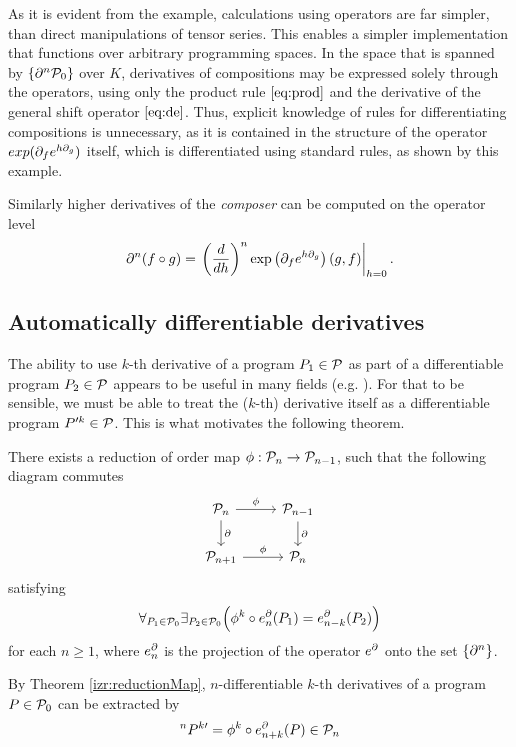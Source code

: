  As it is evident from the example, calculations using operators are far
 simpler, than direct manipulations of tensor series. This enables a simpler
 implementation that functions over arbitrary programming spaces. In
 the space that is spanned by $\{\partial^n\mathcal{P}_0\}$ over $K$, derivatives of
 compositions may be expressed solely through the operators, using only the
 product rule $\eqref{eq:prod}$ and the derivative of the general shift operator
 $\eqref{eq:de}$. Thus, explicit knowledge of rules for differentiating
 compositions is unnecessary, as it is contained in the structure of the
 operator $exp(\partial_fe^{h\partial_g})$ itself, which is differentiated using standard
 rules, as shown by this example. 

 Similarly higher derivatives of the \emph{composer} can be computed on the
 operator level
 \begin{equation}\label{eq:dkompo}
 \partial^n(f\circ g)=\left.\left(\frac{d}{dh}\right)^n\exp\left(\partial_fe^{h\partial_g}\right)(g,f)\right|_{h=0}.
 \end{equation}

 \subsection{Automatically differentiable derivatives}\label{sec:orderReduction}
 
 The ability to use $k$-th derivative of a program $P_1\in\mathcal{P}$ as part of a differentiable program $P_2\in\mathcal{P}$ appears to be useful in many fields (e.g. \cite{StatMC}). For that to be sensible, we must be able to treat the ($k$-th) derivative itself as a differentiable program $P^{\prime k}\in\mathcal{P}$. This is what motivates the following theorem. 

\begin{theorem}\label{izr:reductionMap}
There exists a reduction of order map $\phi:\mathcal{P}_n\to \mathcal{P}_{n-1}$, such that the
following  diagram commutes
\begin{equation}\label{eq:reductionMap}
\begin{tikzcd}
  \dP_n \arrow{r}{\phi} \arrow{d}{\D} & 
  \dP_{n-1} \arrow{d}{\D}\\
  \dP_{n+1} \arrow{r}{\phi} & 
  \dP_{n}
\end{tikzcd}
\end{equation}
satisfying
\begin{equation*}
\forall_{P_1\in\mathcal{P}_0}\exists_{P_2\in\mathcal{P}_0}\Big(\phi^k\circ e^\partial_n(P_1)=e^\partial_{n-k}(P_2)\Big)
\end{equation*}
for each $n\ge 1$, where $e^\partial_n$ is the projection of the operator $e^\partial$ onto the set $\{\partial^n\}$.
\end{theorem}  
\begin{corollary}\label{cor:extraxtDerivatives}
By Theorem \ref{izr:reductionMap}, $n$-differentiable $k$-th derivatives of a program $P\in\mathcal{P}_0$ can be extracted by
\begin{equation*}
^{n}P^{k\prime}=\phi^k\circ e^\partial_{n+k}(P)\in\mathcal{P}_n
\end{equation*}
\end{corollary}

